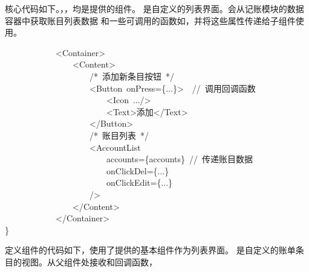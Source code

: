 \documentclass{article}
\begin{document}
核心代码如下。，，均是提供的组件。
是自定义的列表界面。会从记账模块的数据容器中获取账目列表数据
和一些可调用的函数如，并将这些属性传递给子组件使用。%
\begin{mdpre}%
\noindent~~~~~~~~~~~~\textless{}Container\textgreater{}\\
~~~~~~~~~~~~~~~~\textless{}Content\textgreater{}\\
~~~~~~~~~~~~~~~~~~~~{/*}{~添加新条目按钮~}{*/}\\
~~~~~~~~~~~~~~~~~~~~\textless{}Button~onPress=\{...\}\textgreater{}~~{//~调用回调函数}\\
~~~~~~~~~~~~~~~~~~~~~~~~\textless{}Icon~.../\textgreater{}\\
~~~~~~~~~~~~~~~~~~~~~~~~\textless{}Text\textgreater{}添加\textless{}/Text\textgreater{}\\
~~~~~~~~~~~~~~~~~~~~\textless{}/Button\textgreater{}\\
~~~~~~~~~~~~~~~~~~~~{/*}{~账目列表~}{*/}\\
~~~~~~~~~~~~~~~~~~~~\textless{}AccountList\\
~~~~~~~~~~~~~~~~~~~~~~~~accounts=\{accounts\}~{//~传递账目数据}\\
~~~~~~~~~~~~~~~~~~~~~~~~onClickDel=\{...\}\\
~~~~~~~~~~~~~~~~~~~~~~~~onClickEdit=\{...\}\\
~~~~~~~~~~~~~~~~~~~~/\textgreater{}\\
~~~~~~~~~~~~~~~~\textless{}/Content\textgreater{}\\
~~~~~~~~~~~~\textless{}/Container\textgreater{}\\
\}%
\end{mdpre}\noindent{}定义组件的代码如下，使用了提供的基本组件作为列表界面。
是自定义的账单条目的视图。从父组件处接收和回调函数，
\end{document}
